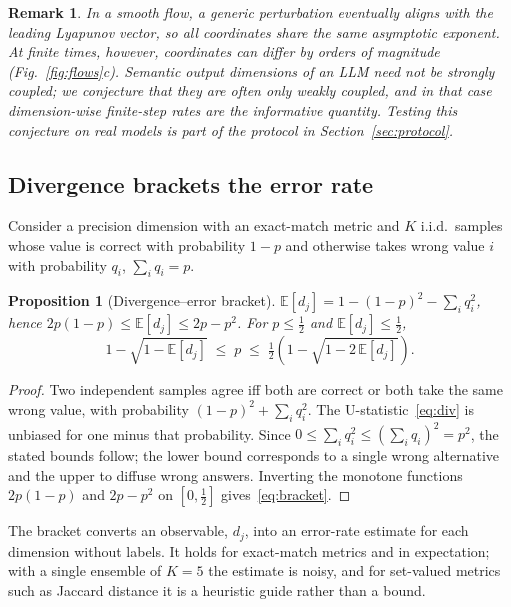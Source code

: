 \documentclass[preprint,12pt]{elsarticle}
\newtheorem{proposition}{Proposition}
\newtheorem{remark}{Remark}
\begin{document}
\begin{remark}
In a smooth flow, a generic perturbation eventually aligns with the leading Lyapunov vector, so all coordinates share the same asymptotic exponent. At finite times, however, coordinates can differ by orders of magnitude (Fig.~\ref{fig:flows}c). Semantic output dimensions of an LLM need not be strongly coupled; we conjecture that they are often only weakly coupled, and in that case dimension-wise finite-step rates are the informative quantity. Testing this conjecture on real models is part of the protocol in Section~\ref{sec:protocol}.
\end{remark}

\subsection{Divergence brackets the error rate}
Consider a precision dimension with an exact-match metric and $K$ i.i.d.\ samples whose value is correct with probability $1-p$ and otherwise takes wrong value $i$ with probability $q_i$, $\sum_i q_i=p$.

\begin{proposition}[Divergence--error bracket]
\label{prop:bracket}
$\mathbb{E}[d_j]=1-(1-p)^2-\sum_i q_i^2$, hence $2p(1-p)\le\mathbb{E}[d_j]\le 2p-p^2$. For $p\le\tfrac12$ and $\mathbb{E}[d_j]\le\tfrac12$,
\begin{equation}
1-\sqrt{1-\mathbb{E}[d_j]}\;\le\;p\;\le\;\tfrac12\left(1-\sqrt{1-2\,\mathbb{E}[d_j]}\right).
\label{eq:bracket}
\end{equation}
\end{proposition}
\begin{proof}
Two independent samples agree iff both are correct or both take the same wrong value, with probability $(1-p)^2+\sum_i q_i^2$. The U-statistic~\eqref{eq:div} is unbiased for one minus that probability. Since $0\le\sum_i q_i^2\le(\sum_i q_i)^2=p^2$, the stated bounds follow; the lower bound corresponds to a single wrong alternative and the upper to diffuse wrong answers. Inverting the monotone functions $2p(1-p)$ and $2p-p^2$ on $[0,\tfrac12]$ gives~\eqref{eq:bracket}.
\end{proof}
The bracket converts an observable, $d_j$, into an error-rate estimate for each dimension without labels. It holds for exact-match metrics and in expectation; with a single ensemble of $K=5$ the estimate is noisy, and for set-valued metrics such as Jaccard distance it is a heuristic guide rather than a bound.
\end{document}
